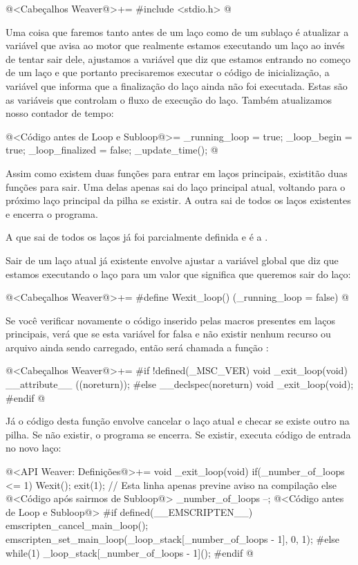 @<Cabeçalhos Weaver@>+=
#include <stdio.h>
@

Uma coisa que faremos tanto antes de um laço como de um sublaço é
atualizar a variável  que avisa ao motor
que realmente estamos executando um laço ao invés de tentar sair dele,
ajustamos a variável que diz que estamos entrando no começo de um laço
e que portanto precisaremos executar o código de inicialização, a
variável que informa que a finalização do laço ainda não foi
executada. Estas são as variáveis que controlam o fluxo de execução do
laço. Também atualizamos nosso contador de tempo:

\iniciocodigo
@<Código antes de Loop e Subloop@>=
_running_loop = true;
_loop_begin = true;
_loop_finalized = false;
_update_time();
@
\fimcodigo


Assim como existem duas funções para entrar em laços principais,
existitão duas funções para sair. Uma delas apenas sai do laço
principal atual, voltando para o próximo laço principal da pilha se
existir. A outra sai de todos os laços existentes e encerra o
programa.

A que sai de todos os laços já foi parcialmente definida e é
a .

Sair de um laço atual já existente envolve ajustar a variável global
que diz que estamos executando o laço para um valor que significa que
queremos sair do laço:

\iniciocodigo
@<Cabeçalhos Weaver@>+=
#define Wexit_loop() (_running_loop = false)
@
\fimcodigo

Se você verificar novamente o código inserido pelas macros presentes
em laços principais, verá que se esta variável for falsa e não existir
nenhum recurso ou arquivo ainda sendo carregado, então será chamada a
função :

\iniciocodigo
@<Cabeçalhos Weaver@>+=
#if !defined(_MSC_VER)
void _exit_loop(void) __attribute__ ((noreturn));
#else
__declspec(noreturn) void _exit_loop(void);
#endif
@
\fimcodigo

Já o código desta função envolve cancelar o laço atual e checar se
existe outro na pilha. Se não existir, o programa se encerra. Se
existir, executa código de entrada no novo laço:

\iniciocodigo
@<API Weaver: Definições@>+=
void _exit_loop(void){
  if(_number_of_loops <= 1){
    Wexit();
    exit(1); // Esta linha apenas previne aviso na compilação
  }
  else{
    @<Código após sairmos de Subloop@>
    _number_of_loops --;
    @<Código antes de Loop e Subloop@>
#if defined(__EMSCRIPTEN__)
    emscripten_cancel_main_loop();
    emscripten_set_main_loop(_loop_stack[_number_of_loops - 1], 0, 1);
#else
    while(1)
      _loop_stack[_number_of_loops - 1]();
#endif
  }
}
@
\fimcodigo

